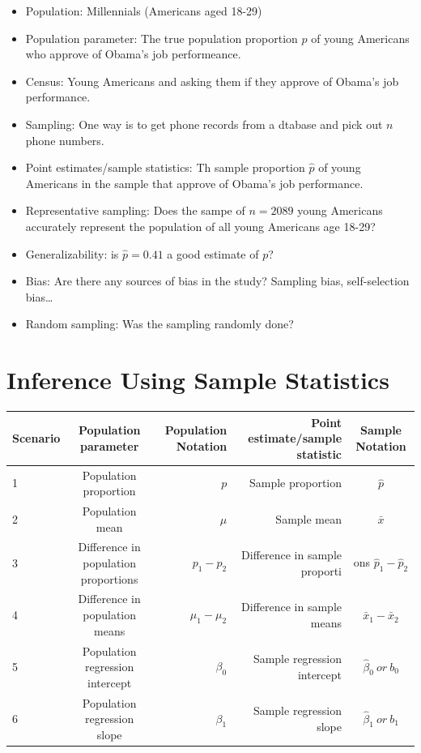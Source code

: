 \documentclass[]{article}
\providecommand{\tightlist}{%
  \setlength{\itemsep}{0pt}\setlength{\parskip}{0pt}}
\begin{document}
\begin{itemize}
\tightlist
\item
  Population: Millennials (Americans aged 18-29)
\item
  Population parameter: The true population proportion \(p\) of young
  Americans who approve of Obama's job performeance.
\item
  Census: Young Americans and asking them if they approve of Obama's job
  performance.\\
\item
  Sampling: One way is to get phone records from a dtabase and pick out
  \(n\) phone numbers.
\item
  Point estimates/sample statistics: Th sample proportion \(\hat{p}\) of
  young Americans in the sample that approve of Obama's job
  performance.\\
\item
  Representative sampling: Does the sampe of \(n = 2089\) young
  Americans accurately represent the population of all young Americans
  age 18-29?
\item
  Generalizability: is \(\hat{p} = 0.41\) a good estimate of \(p\)?
\item
  Bias: Are there any sources of bias in the study? Sampling bias,
  self-selection bias\ldots{}
\item
  Random sampling: Was the sampling randomly done?
\end{itemize}

\section{Inference Using Sample Statistics}\label{sec:Inference}

\begin{longtable}[]{@{}lcrrc@{}}
\toprule
Scenario & Population parameter & Population Notation & Point
estimate/sample statistic & Sample Notation\tabularnewline
\midrule
\endhead
1 & Population proportion & \(p\) & Sample proportion &
\(\hat{p}\)\tabularnewline
2 & Population mean & \(\mu\) & Sample mean & \(\bar{x}\)\tabularnewline
3 & Difference in population proportions & \(p_1-p_2\) & Difference in
sample proporti & ons \(\hat{p}_1-\hat{p}_2\)\tabularnewline
4 & Difference in population means & \(\mu_1-\mu_2\) & Difference in
sample means & \(\bar{x}_1-\bar{x}_2\)\tabularnewline
5 & Population regression intercept & \(\beta_0\) & Sample regression
intercept & \(\hat{\beta}_0~or~b_0\)\tabularnewline
6 & Population regression slope & \(\beta_1\) & Sample regression slope
& \(\hat{\beta}_1~or~b_1\)\tabularnewline
\bottomrule
\end{longtable}
\end{document}
